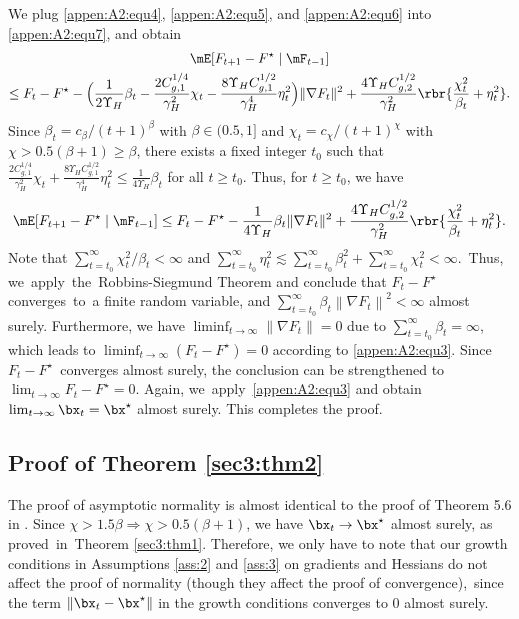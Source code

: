 We plug \eqref{appen:A2:equ4}, \eqref{appen:A2:equ5}, and \eqref{appen:A2:equ6} into \eqref{appen:A2:equ7}, and obtain
\begin{multline*}
\mE[F_{t+1}-F^\star\mid\mF_{t-1}] \\ 
\leq F_t-F^\star - \Big(\frac{1}{2\Upsilon_H}\beta_t - \frac{2C_{g,1}^{1/4}}{\gamma_H^2}\chi_t-\frac{8\Upsilon_H C_{g,1}^{1/2}}{\gamma_H^4}\eta_t^2\Big)\|\nabla F_t\|^2 + \frac{4\Upsilon_H C_{g, 2}^{1/2}}{\gamma_H^2}\rbr{\frac{\chi_t^2}{\beta_t}+\eta_t^2}.
\end{multline*}
Since $\beta_t = c_{\beta}/(t+1)^{\beta}$ with $\beta\in(0.5, 1]$ and $\chi_t = c_{\chi}/(t+1)^{\chi}$ with $\chi>0.5(\beta+1)\geq \beta$, there exists a fixed integer $t_0$ such that $\frac{2C_{g,1}^{1/4}}{\gamma_H^2}\chi_t+\frac{8\Upsilon_H C_{g,1}^{1/2}}{\gamma_H^4}\eta_t^2\leq\frac{1}{4\Upsilon_H}\beta_t$ for all $t\geq t_0$. Thus, for $t\geq t_0$, we have
\begin{equation*}
\mE[F_{t+1}-F^\star\mid\mF_{t-1}]\leq 
F_t-F^\star - \frac{1}{4\Upsilon_H}\beta_t\|\nabla F_t\|^2 + \frac{4\Upsilon_H C_{g, 2}^{1/2}}{\gamma_H^2}\rbr{\frac{\chi_t^2}{\beta_t}+\eta_t^2}.
\end{equation*}
Note that $\sum_{t=t_0}^\infty \chi_t^2/\beta_t<\infty$ and $\sum_{t=t_0}^\infty \eta_t^2\lesssim \sum_{t=t_0}^\infty \beta_t^2 + \sum_{t=t_0}^\infty \chi_t^2<\infty$.~Thus, we~\mbox{apply}~the~Robbins-Siegmund Theorem \cite[Theorem 1.3.12]{Duflo2013Random} and conclude that $F_t-F^\star$ converges~to~a finite random variable, and $\sum_{t=t_0}^{\infty}\beta_t\left\|\nabla F_t\right\|^2 < \infty$ almost surely. Furthermore, we have $\liminf_{t\rightarrow\infty}\|\nabla F_t\|=0$ due to $\sum_{t=t_0}^\infty\beta_t = \infty$, which leads to $\liminf_{t\rightarrow\infty}(F_t-F^\star) =0$ according to \eqref{appen:A2:equ3}. Since $F_t-F^\star$~converges almost surely, the conclusion can be strengthened to $\lim_{t\rightarrow\infty}F_t-F^\star =0$. Again, we~apply~\eqref{appen:A2:equ3} and obtain $\lim_{t\rightarrow\infty}\bx_t = \bx^\star$ almost surely. This completes the proof.



\subsection{Proof of Theorem \ref{sec3:thm2}}\label{pf:sec3:thm2}

The proof of asymptotic normality is almost identical to the proof of Theorem 5.6 in \cite{Na2022Statistical}. Since $\chi>1.5\beta\Rightarrow \chi>0.5(\beta+1)$, we have $\bx_t\rightarrow \bx^\star$ almost surely, as proved~in~Theorem \ref{sec3:thm1}. Therefore, we only have to note that our growth conditions in Assumptions \ref{ass:2} and \ref{ass:3} on gradients and Hessians do not affect the proof of normality (though they affect the proof of convergence),~since the term $\|\bx_t-\bx^\star\|$ in the growth conditions converges to $0$ almost surely.


